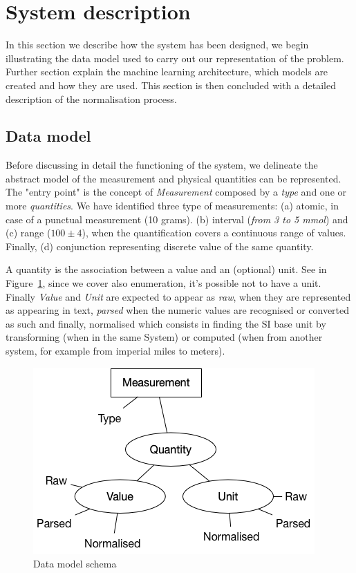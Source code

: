 \documentclass[sigconf]{acmart}
\begin{document}
\section{System description}
\label{sec:system}

In this section we describe how the system has been designed, we begin illustrating the data model used to carry out our representation of the problem. Further section explain the machine learning architecture, which models are created and how they are used. This section is then concluded with a detailed description of the normalisation process.

\subsection{Data model}
\label{subsub:data-model}
Before discussing in detail the functioning of the system, we delineate the abstract model of the measurement and physical quantities can be represented. 
The "entry point" is the concept of \textit{Measurement} composed by a \textit{type} and one or more \textit{quantities}. We have identified three type of measurements: (a) atomic, in case of a punctual measurement (10 grams). (b) interval (\textit{from 3 to 5 mmol}) and (c) range ($100 \pm 4$), when the quantification covers a continuous range of values. Finally, (d) conjunction representing discrete value of the same quantity. 

A quantity is the association between a value and an (optional) unit. See in Figure~\ref{fig:data-model-schema-2}, since we cover also enumeration, it's possible not to have a unit. Finally \textit{Value} and \textit{Unit} are expected to appear as \textit{raw}, when they are represented as appearing in text, \textit{parsed} when the numeric values are recognised or converted as such and finally, normalised which consists in finding the SI base unit by transforming (when in the same System) or computed (when from another system, for example from imperial miles to meters). 

\begin{figure}[h]
  \centering
  \includegraphics[width=\linewidth]{images/schema-2}
  \caption{Data model schema}
  \label{fig:data-model-schema-2}
\end{figure}
\end{document}
